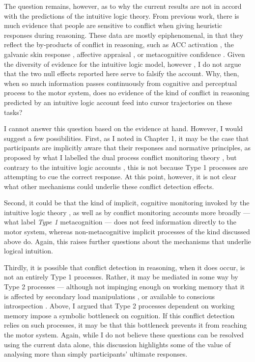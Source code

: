 The question remains, however,
as to why the current results are not in accord with
the predictions of the intuitive logic theory.
From previous work, there is much evidence
that people are sensitive to conflict
when giving heuristic responses during reasoning.
These data are mostly epiphenomenal,
in that they reflect the by-products of conflict in reasoning,
such as ACC activation \citep{DeNeys2008a},
the galvanic skin response \citep{DeNeys2008},
affective appraisal \citep{Morsanyi2012},
or metacognitive confidence \citep{DeNeys2011b}.
Given the diversity of evidence for the intuitive logic model, however
\citep[see][for a review]{DeNeys2012},
I do not argue that the two null effects reported here
serve to falsify the account.
Why, then, when so much information passes continuously
from cognitive and perceptual process to the motor system,
does no evidence of the kind of conflict in reasoning
predicted by an intuitive logic account
feed into cursor trajectories on these tasks?

I cannot answer this question based on the evidence at hand.
However, I would suggest a few possibilities.
First, as I noted in Chapter 1,
it may be the case that participants are implicitly aware
that their responses and normative principles,
as proposed by what I labelled
the dual process conflict monitoring theory \citep{DeNeys2008,DeNeys2008a},
but contrary to the intuitive logic accounts \citep{DeNeys2012,DeNeys2014a},
this is not because Type 1 processes are attempting to cue the correct response.
At this point, however, it is not clear what other mechanisms
could underlie these conflict detection effects.

Second, it could be that the kind of implicit,
cognitive monitoring invoked
by the intuitive logic theory \citep{DeNeys2012},
as well as by conflict monitoring accounts more broadly \citep{DeNeys2008,Botvinick2004a}
--- what \citet{Shea2014c} label \emph{Type 1} metacognition --- 
does not feed information directly to the motor system,
whereas non-metacognitive implicit processes of the kind discussed above do.
Again, this raises further questions about the mechanisms
that underlie logical intuition.

Thirdly, it is possible that
conflict detection in reasoning,
when it does occur,
is not an entirely Type 1 processes.
Rather, it may be mediated in some way by Type 2 processes
--- although not impinging enough on working memory
that it is affected by secondary load manipulations \citep{Franssens2009},
or available to conscious introspection \citep{DeNeys2008}.
Above, I argued that Type 2 processes dependent on working memory
impose a symbolic bottleneck on cognition.
If this conflict detection relies on such processes,
it may be that this bottleneck prevents it
from reaching the motor system.
Again, while I do not believe
these questions can be resolved using
the current data alone,
this discussion highlights some of the value
of analysing more than simply participants' ultimate responses.


